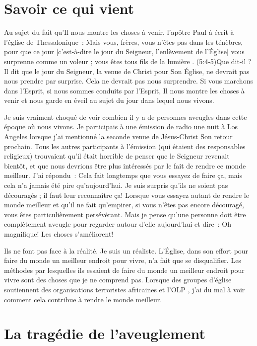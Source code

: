 \section{Savoir ce qui vient}

Au sujet du fait qu'Il nous montre les choses à venir,
 l'apôtre Paul à écrit à l'église de Thessalonique~:
 \og Mais vous, frères, vous n'êtes pas dans les ténèbres,
 pour que ce jour [c'est-à-dire le jour du Seigneur,
 l'enlèvement de l'Église] vous surprenne comme un voleur ;
 vous êtes tous fils de la lumière \fg{}.
 (5:4-5)Que dit-il ?
 Il dit que le jour du Seigneur, la venue de Christ
 pour Son Église, ne devrait pas nous prendre par surprise.
 Cela ne devrait pas nous surprendre. Si vous marchons dans l'Esprit,
 si nous sommes conduits par l'Esprit, Il nous montre les choses à venir
 et nous garde en éveil au sujet du jour dans lequel nous vivons.

Je suis vraiment choqué de voir combien il y a de personnes aveugles
 dans cette époque où nous vivons. Je participais à une émission de radio
 une nuit à Los Angeles lorsque j'ai mentionné la seconde venue
 de Jésus-Christ \ocadr Son retour prochain.
 Tous les autres participants à l'émission
 (qui étaient des responsables religieux) trouvaient qu'il était horrible
 de penser que le Seigneur revenait bientôt, et que nous devrions être plus
 intéressés par le fait de rendre ce monde meilleur. J'ai répondu~:
 \og Cela fait longtemps que vous essayez de faire ça, mais cela n'a jamais
 été pire qu'aujourd'hui. \fg{}
 Je suis surpris qu'ils ne soient pas découragés ;
 il faut leur reconnaître ça!
 Lorsque vous essayez autant de rendre le monde meilleur et qu'il ne fait
 qu'empirer, si vous n'êtes pas encore découragé, vous êtes
 particulièrement persévérant.
 Mais je pense qu'une personne doit être complètement aveugle pour regarder
 autour d'elle aujourd'hui et dire~:
 \og Oh magnifique! Les choses s'améliorent! \fg{}

Ils ne font pas face à la réalité. Je suis un réaliste.
 L'Église, dans son effort pour faire du monde un meilleur endroit
 pour vivre, n'a fait que se disqualifier.
 Les méthodes par lesquelles ils essaient de faire du monde un meilleur
 endroit pour vivre sont des choses que je ne comprend pas. 
 Lorsque des groupes d'église soutiennent des organisations terroristes
 africaines et l'OLP ,
 j'ai du mal à voir comment cela contribue à rendre le monde meilleur.

\section{La trag\'edie de l'aveuglement}

